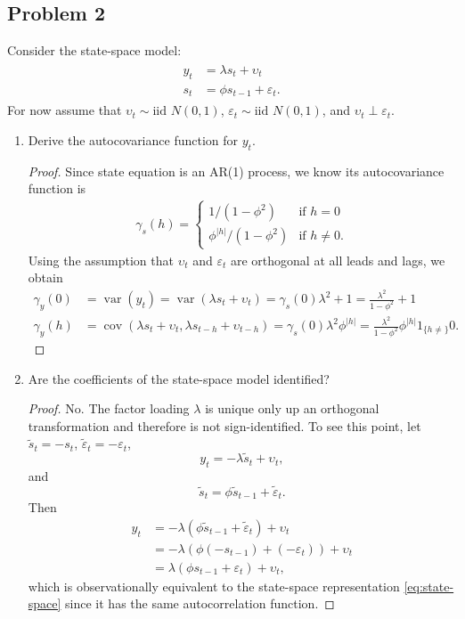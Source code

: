 \documentclass[oneside,reqno]{amsart}
\DeclareMathOperator{\var}{var}
\DeclareMathOperator{\cov}{cov}
\newcommand{\eps}{\varepsilon}
\newcommand{\ups}{\upsilon}
\theoremstyle{definition}
\begin{document}
\subsection*{Problem 2}
Consider the state-space model:
\begin{align}\label{eq:state-space}
\begin{split}
	y_t &= \lambda s_t + \ups_t   \\
	s_t &= \phi s_{t-1} + \eps_t.
\end{split}
\end{align}
For now assume that $\ups_t \sim \text{iid }N(0,1)$, $\eps_t \sim \text{iid }N(0,1)$, and $\ups_t \perp\eps_t$.
\begin{enumerate}
\item
Derive the autocovariance function for $y_t$.

\begin{proof}
Since state equation is an AR(1) process, we know its autocovariance function is
\begin{align*}
	\gamma_s(h)  = \begin{cases}
		1/(1-\phi^2) & \text{if } h = 0 \\
		\phi^{|h|}/(1-\phi^2) & \text{if } h \neq 0.				
	\end{cases}
\end{align*}
Using the assumption that $\ups_t$ and $\eps_t$ are orthogonal at all leads and lags, we obtain
\begin{align*}
	\gamma_y(0) &= \var(y_t) = \var(\lambda s_t + \ups_t) 
		= \gamma_s(0)\lambda^2 + 1 
		= \frac{\lambda^2}{1-\phi^2} + 1 \\
	\gamma_y(h) &= \cov(\lambda s_t + \ups_t, \lambda s_{t-h} + \ups_{t-h}) 
		= \gamma_s(0) \lambda^2 \phi^{|h|} = \frac{\lambda^2}{1-\phi^2} \phi^{|h|} 1_{\{h \neq\}} 0.
\end{align*}
\end{proof}

\item
Are the coefficients of the state-space model identified?

\begin{proof}
No. The factor loading $\lambda$ is unique only up an orthogonal transformation and therefore is not sign-identified. To see this point, let $\tilde s_t = -s_t$, $\tilde\eps_t = -\eps_t$,  
\[
	y_t = -\lambda \tilde s_t + \ups_t,
\]
and
\[
	\tilde s_t = \phi \tilde s_{t-1} + \tilde\eps_t.
\]
Then 
\begin{align*}
	y_t &= -\lambda (\phi \tilde s_{t-1} + \tilde\eps_t) + \ups_t \\
	&= -\lambda (\phi (- s_{t-1}) + (-\eps_t)) + \ups_t \\
	&= \lambda (\phi s_{t-1}  + \eps_t) + \ups_t,
\end{align*}
which is observationally equivalent to the state-space representation \eqref{eq:state-space} since it has the same autocorrelation function.
\end{proof}


\end{enumerate}
\end{document}
